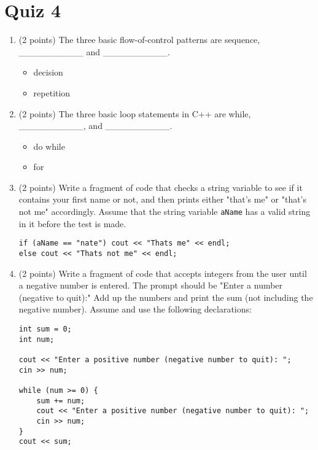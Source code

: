 \documentclass{report}
\begin{document}
    \pagebreak \bigbreak \noindent 
    \section{\LARGE Quiz 4}
    \bigbreak \noindent 
    \begin{enumerate}
    \item (2 points) The three basic flow-of-control patterns are sequence, _\_\_\_\_\_\_\_\_\_ and \_\_\_\_\_\_\_\_\_\_.
        \begin{itemize}
            \item decision
            \item repetition
        \end{itemize}
    
    \item (2 points) The three basic loop statements in C++ are while, \_\_\_\_\_\_\_\_\_\_, and \_\_\_\_\_\_\_\_\_\_.
        \begin{itemize}
            \item do while
            \item for
        \end{itemize}
    
    \item (2 points) Write a fragment of code that checks a string variable to see if it contains your first name or not, and then prints either "that's me" or "that's not me" accordingly. Assume that the string variable \texttt{aName} has a valid string in it before the test is made.
    \begin{verbatim}
if (aName == "nate") cout << "Thats me" << endl;
else cout << "Thats not me" << endl;
    \end{verbatim}

    
    \item (2 points) Write a fragment of code that accepts integers from the user until a negative number is entered. The prompt should be "Enter a number (negative to quit):" Add up the numbers and print the sum (not including the negative number). Assume and use the following declarations:
    \begin{verbatim}
int sum = 0;
int num;

cout << "Enter a positive number (negative number to quit): ";
cin >> num;

while (num >= 0) {
    sum += num;
    cout << "Enter a positive number (negative number to quit): ";
    cin >> num;
}
cout << sum;
    \end{verbatim}
    

\end{enumerate}
\end{document}

